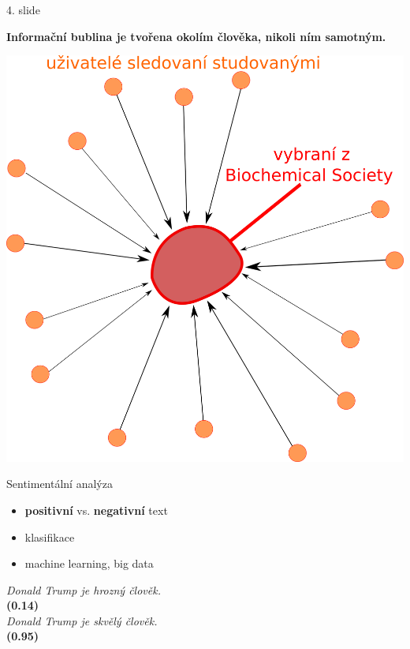 \documentclass[notheorems,12pt]{beamer}
\begin{document}
\begin{frame}{4. slide}
    \centering
    \begin{large}\textbf{Informační bublina je tvořena okolím člověka, nikoli ním samotným.}\end{large}

    \includegraphics[scale=0.4]{./Pics/followers.png}
\end{frame}
\begin{frame}{Sentimentální analýza}
    \begin{itemize}
        \item \textbf{positivní} vs. \textbf{negativní} text
        \item klasifikace
        \item machine learning, big data
    \end{itemize}
    \center
    \textit{Donald Trump je hrozný člověk.}\\
    \textbf{(0.14)}\\
    \vspace{0.5cm}
    \textit{Donald Trump je skvělý člověk.}\\
    \textbf{(0.95)}
\end{frame}
\end{document}
